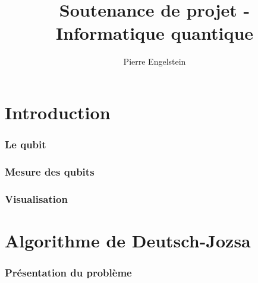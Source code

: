 \documentclass{beamer}
\title{Soutenance de projet - Informatique quantique}
\author{Pierre Engelstein}
\institute{Polytech Angers}
\begin{document}

\frame{\titlepage}








% 


\section{Introduction}

\begin{frame}

\frametitle{Le qubit}
\end{frame}

\begin{frame}
\frametitle{Mesure des qubits}
\end{frame}

\begin{frame}
\frametitle{Visualisation}
\end{frame}

\section{Algorithme de Deutsch-Jozsa}

\begin{frame}
\frametitle{Présentation du problème}
\end{frame}
\end{document}
